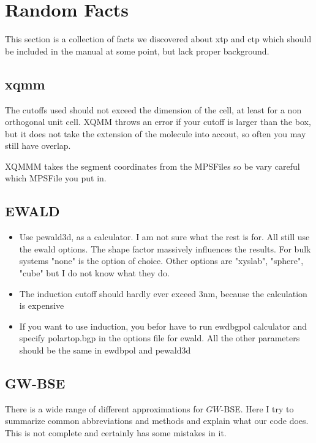 \section{Random Facts}

This section is a collection of facts we discovered about xtp and ctp which should be included in the manual at some point, but lack proper background.



\subsection{xqmm}

The cutoffs used should not exceed the dimension of the cell, at least for a non orthogonal unit cell. XQMM throws an error if your cutoff is larger than the box, but it does not take the extension of the molecule into accout, so often you may still have overlap.

XQMMM takes the segment coordinates from the MPS\textunderscore Files so be vary careful which MPS\textunderscore File you put in.


\subsection{EWALD}


\begin{itemize}
\item Use pewald3d, as a calculator. I am not sure what the rest is for. All still use the ewald options. The shape factor massively influences the results. For bulk systems "none" is the option of choice. Other options are "xyslab", "sphere", "cube" but I do not know what they do.
\item The induction cutoff should hardly ever exceed 3nm, because the calculation is expensive
\item If you want to use induction, you befor have to run ewdbgpol calculator and specify polar\textunderscore top.bgp in the options file for ewald. All the other parameters should be the same in ewdbpol and pewald3d
\end{itemize}

\subsection{GW-BSE}

There is a wide range of different approximations for $GW$-BSE. Here I try to summarize common abbreviations and methods and explain what our code does. This is not complete and certainly has some mistakes in it. 



